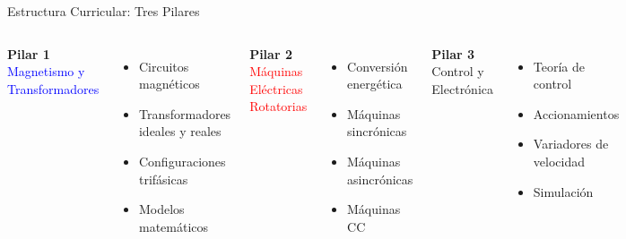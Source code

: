 \documentclass[aspectratio=43]{beamer}
\begin{document}
  \begin{frame}{Estructura Curricular: Tres Pilares}
  \begin{columns}[T]
  \centering
  \textbf{Pilar 1}\\
  \textcolor{blue}{Magnetismo y Transformadores}
  \begin{itemize}
  \item Circuitos magnéticos
  \item Transformadores ideales y reales
  \item Configuraciones trifásicas
  \item Modelos matemáticos
  \end{itemize}
  
  \centering
  \textbf{Pilar 2}\\
  \textcolor{red}{Máquinas Eléctricas Rotatorias}
  \begin{itemize}
  \item Conversión energética
  \item Máquinas sincrónicas
  \item Máquinas asincrónicas
  \item Máquinas CC
  \end{itemize}
  
  \centering
  \textbf{Pilar 3}\\
  \textcolor{green!50!black}{Control y Electrónica}
  \begin{itemize}
  \item Teoría de control
  \item Accionamientos
  \item Variadores de velocidad
  \item Simulación
  \end{itemize}
  \end{columns}
  
  
  \end{frame}
  
\end{document}
